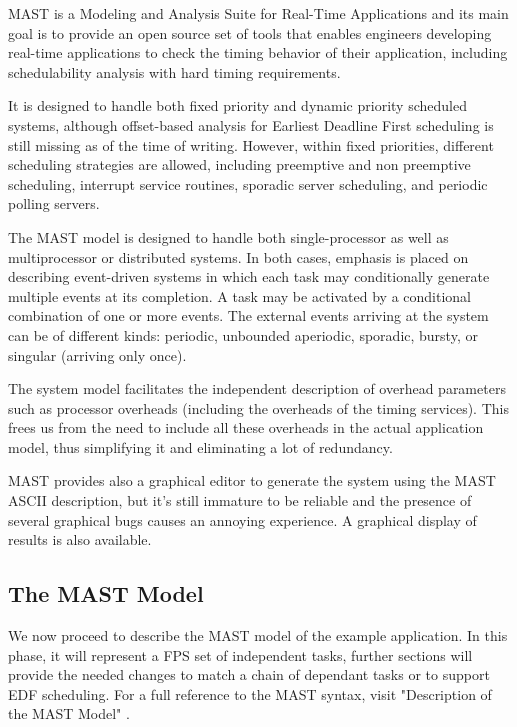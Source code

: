 \documentclass{article}
\begin{document}
MAST \cite{mast} is a Modeling and Analysis Suite for Real-Time Applications and its main goal is to provide an open source set of tools that enables engineers developing real-time applications to check the timing behavior of their application, including schedulability analysis with hard timing requirements.

It is designed to handle both fixed priority and dynamic priority scheduled systems, although offset-based analysis for Earliest Deadline First scheduling is still missing as of the time of writing. However, within fixed priorities, different scheduling strategies are allowed, including preemptive and non preemptive scheduling, interrupt service routines, sporadic server scheduling, and periodic polling servers.

The MAST model is designed to handle both single-processor as well as multiprocessor or distributed systems. In both cases, emphasis is placed on describing event-driven systems in which each task may conditionally generate multiple events at its completion. A task may be activated by a conditional combination of one or more events. The external events arriving at the system can be of different kinds: periodic, unbounded aperiodic, sporadic, bursty, or singular (arriving only once).

The system model facilitates the independent description of overhead parameters such as processor overheads (including the overheads of the timing services). This frees us from the need to include all these overheads in the actual application model, thus simplifying it and eliminating a lot of redundancy.

MAST provides also a graphical editor to generate the system using the MAST ASCII description, but it's still immature to be reliable and the presence of several graphical bugs causes an annoying experience. A graphical display of results is also available.

\subsection{The MAST Model}

We now proceed to describe the MAST model of the example application. In this phase, it will represent a FPS set of independent tasks, further sections will provide the needed changes to match a chain of dependant tasks or to support EDF scheduling. For a full reference to the MAST syntax, visit "Description of the MAST Model" \cite{mast-description}.
\end{document}
